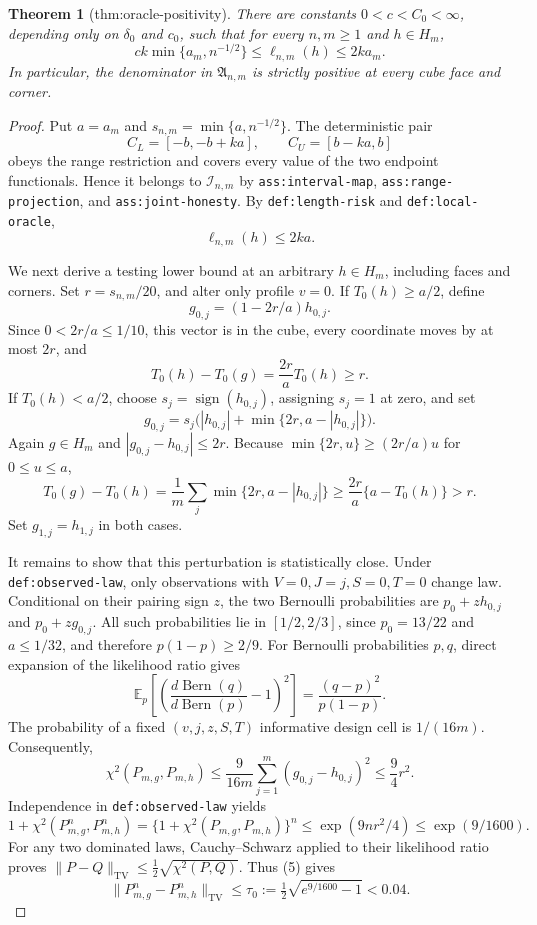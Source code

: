 \documentclass{article}
\newtheorem{theorem}{Theorem}
\begin{document}
\begin{theorem}[thm:oracle-positivity]\label{thm:oracle-positivity}
There are constants \(0<c<C_0<\infty\), depending only on \(\delta_0\) and \(c_0\), such that for every \(n,m\ge1\) and \(h\in H_m\), \[ck\min\{a_m,n^{-1/2}\}\le\ell_{n,m}(h)\le2ka_m.\] In particular, the denominator in \(\mathfrak A_{n,m}\) is strictly positive at every cube face and corner.
\end{theorem}
\begin{proof}
Put \(a=a_m\) and \(s_{n,m}=\min\{a,n^{-1/2}\}\).  The deterministic pair
\[
 C_L=[-b,-b+ka],\qquad C_U=[b-ka,b]
\]
obeys the range restriction and covers every value of the two endpoint
functionals.  Hence it belongs to \(\mathcal I_{n,m}\) by
\texttt{ass:interval-map}, \texttt{ass:range-projection}, and
\texttt{ass:joint-honesty}.  By \texttt{def:length-risk} and
\texttt{def:local-oracle},
\[
 \ell_{n,m}(h)\le 2ka.                                                    \tag{1}
\]

We next derive a testing lower bound at an arbitrary \(h\in H_m\), including
faces and corners.  Set \(r=s_{n,m}/20\), and alter only profile \(v=0\).
If \(T_0(h)\ge a/2\), define
\[
 g_{0,j}=(1-2r/a)h_{0,j}.
\]
Since \(0<2r/a\le 1/10\), this vector is in the cube, every coordinate moves
by at most \(2r\), and
\[
 T_0(h)-T_0(g)=\frac{2r}{a}T_0(h)\ge r.                                  \tag{2}
\]
If \(T_0(h)<a/2\), choose \(s_j=\operatorname{sign}(h_{0,j})\), assigning
\(s_j=1\) at zero, and set
\[
 g_{0,j}=s_j\bigl(|h_{0,j}|+\min\{2r,a-|h_{0,j}|\}\bigr).
\]
Again \(g\in H_m\) and \(|g_{0,j}-h_{0,j}|\le2r\).  Because
\(\min\{2r,u\}\ge(2r/a)u\) for \(0\le u\le a\),
\[
 T_0(g)-T_0(h)
 =\frac1m\sum_j\min\{2r,a-|h_{0,j}|\}
 \ge\frac{2r}{a}\{a-T_0(h)\}>r.                                        \tag{3}
\]
Set \(g_{1,j}=h_{1,j}\) in both cases.

It remains to show that this perturbation is statistically close.  Under
\texttt{def:observed-law}, only observations with
\(V=0,J=j,S=0,T=0\) change law.  Conditional on their pairing sign \(z\),
the two Bernoulli probabilities are \(p_0+zh_{0,j}\) and \(p_0+zg_{0,j}\).
All such probabilities lie in \([1/2,2/3]\), since
\(p_0=13/22\) and \(a\le1/32\), and therefore \(p(1-p)\ge2/9\).
For Bernoulli probabilities \(p,q\), direct expansion of the likelihood
ratio gives
\[
 \mathbb E_p\left[\left(\frac{d\operatorname{Bern}(q)}
 {d\operatorname{Bern}(p)}-1\right)^2\right]
 =\frac{(q-p)^2}{p(1-p)}.
\]
The probability of a fixed \((v,j,z,S,T)\) informative design cell is
\(1/(16m)\).  Consequently,
\[
 \chi^2(P_{m,g},P_{m,h})
 \le \frac{9}{16m}\sum_{j=1}^m(g_{0,j}-h_{0,j})^2
 \le\frac94r^2.                                                         \tag{4}
\]
Independence in \texttt{def:observed-law} yields
\[
 1+\chi^2(P_{m,g}^n,P_{m,h}^n)
 =\{1+\chi^2(P_{m,g},P_{m,h})\}^n
 \le \exp(9nr^2/4)\le \exp(9/1600).                                    \tag{5}
\]
For any two dominated laws, Cauchy--Schwarz applied to their likelihood
ratio proves
\(\|P-Q\|_{\mathrm{TV}}\le\frac12\sqrt{\chi^2(P,Q)}\).  Thus (5) gives
\[
 \|P_{m,g}^n-P_{m,h}^n\|_{\mathrm{TV}}
 \le\tau_0:=\tfrac12\sqrt{e^{9/1600}-1}<0.04.                           \tag{6}
\]


\end{proof}
\end{document}
